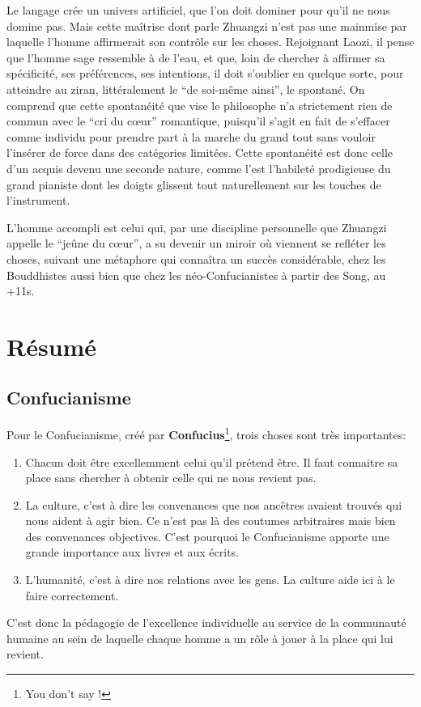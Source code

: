Le langage crée un univers artificiel, que l'on doit dominer pour qu'il ne nous domine pas.
Mais cette maîtrise dont parle Zhuangzi n'est pas une mainmise par laquelle l'homme
affirmerait son contrôle sur les choses.
Rejoignant Laozi, il pense que l'homme sage ressemble à de l'eau, et que, loin de chercher à affirmer sa spécificité, ses préférences, ses
intentions, il doit s'oublier en quelque sorte, pour atteindre au ziran, littéralement le ``de
soi-même ainsi'', le spontané.
On comprend que cette spontanéité que vise le philosophe
n'a strictement rien de commun avec le ``cri du cœur'' romantique, puisqu'il s'agit en fait
de s'effacer comme individu pour prendre part à la marche du grand tout sans vouloir
l'insérer de force dans des catégories limitées.
Cette spontanéité est donc celle d'un acquis
devenu une seconde nature, comme l'est l'habileté prodigieuse du grand pianiste dont les
doigts glissent tout naturellement sur les touches de l'instrument.

L'homme accompli est celui qui, par une discipline personnelle que Zhuangzi appelle le
``jeûne du cœur'', a su devenir un miroir où viennent se refléter les choses, suivant une métaphore qui connaîtra un succès considérable, chez les Bouddhistes aussi bien
que chez les néo-Confucianistes à partir des Song, au +11s.

\section{Résumé}

\subsection{Confucianisme}
Pour le Confucianisme, créé par \textbf{Confucius}\footnote{You don't say !}, trois choses sont très importantes:
\begin{enumerate}
	\item Chacun doit être excellemment celui qu'il prétend être.
		Il faut connaitre sa place sans chercher à obtenir celle qui ne nous revient pas.
	\item La culture, c'est à dire les convenances que nos ancêtres avaient trouvés qui nous aident à agir bien.
		Ce n'est pas là des coutumes arbitraires mais bien des convenances objectives.
		C'est pourquoi le Confucianisme apporte une grande importance aux livres et aux écrits.
	\item L'humanité, c'est à dire nos relations avec les gens.
		La culture aide ici à le faire correctement.
\end{enumerate}
C'est donc la pédagogie de l'excellence individuelle au service de la communauté humaine au sein de laquelle chaque homme a un rôle à jouer à la place qui lui revient.

